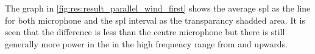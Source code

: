  
  
   
The graph in \autoref{fig:res:result_parallel_wind_first} shows the average \gls{spl} as the line for both microphone and the \gls{spl} interval as the transparancy shadded area. It is seen that the difference is less than the centre microphone but there is still generally more power in the in the high frequency range from  and upwards.   
   
